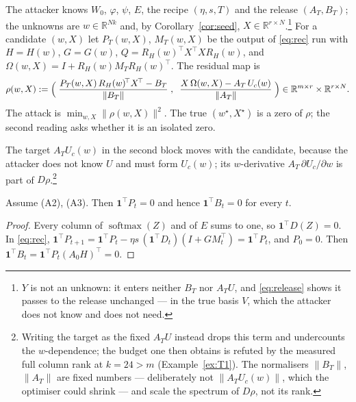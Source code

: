 \begin{definition}\label{def:rho}
The attacker knows $W_0$, $\varphi$, $\psi$, $E$, the recipe $(\eta,s,T)$
and the release $(A_T,B_T)$; the unknowns are $w\in\mathbb R^{Nk}$ and, by
Corollary~\ref{cor:seed}, $X\in\mathbb R^{r\times N}$.\footnote{$Y$ is not an
unknown: it enters neither $B_T$ nor $A_TU$, and \eqref{eq:release} shows it
passes to the release unchanged — in the true basis $V$, which the attacker
does not know and does not need.}
For a candidate $(w,X)$ let $P_T(w,X)$, $M_T(w,X)$ be the output of
\eqref{eq:rec} run with $H=H(w)$, $G=G(w)$, $Q=R_H(w)^{\!\top}X^{\!\top}XR_H(w)$,
and $\Omega(w,X)=I+R_H(w)M_TR_H(w)^{\!\top}$. The residual map is
\begin{equation}\label{eq:rho}
  \rho(w,X):=\Bigl(\;\frac{P_T(w,X)\,R_H(w)^{\!\top}X^{\!\top}-B_T}{\|B_T\|}\;,\;\;
  \frac{X\,\Omega(w,X)-A_T\,U_c(w)}{\|A_T\|}\;\Bigr)
  \in\mathbb R^{m\times r}\times\mathbb R^{r\times N}.
\end{equation}
The attack is $\min_{w,X}\|\rho(w,X)\|^2$. The true $(w^\star,X^\star)$ is a
zero of $\rho$; the second reading asks whether it is an isolated zero.
\end{definition}

The target $A_TU_c(w)$ in the second block moves with the candidate, because
the attacker does not know $U$ and must form $U_c(w)$; its $w$-derivative
$A_T\,\partial U_c/\partial w$ is part of $D\rho$.\footnote{Writing the target
as the fixed $A_TU$ instead drops this term and undercounts the
$w$-dependence; the budget one then obtains is refuted by the measured full
column rank at $k=24>m$ (Example~\ref{ex:T1}). The normalisers $\|B_T\|$,
$\|A_T\|$ are fixed numbers — deliberately not $\|A_TU_c(w)\|$, which the
optimiser could shrink — and scale the spectrum of $D\rho$, not its rank.}

\begin{proposition}\label{prop:simplex}
Assume (A2), (A3). Then $\mathbf 1^{\!\top}P_t=0$ and hence
$\mathbf 1^{\!\top}B_t=0$ for every $t$.
\end{proposition}
\begin{proof}
Every column of $\operatorname{softmax}(Z)$ and of $E$ sums to one, so
$\mathbf 1^{\!\top}D(Z)=0$. In \eqref{eq:rec},
$\mathbf 1^{\!\top}P_{t+1}=\mathbf 1^{\!\top}P_t-\eta s\,(\mathbf 1^{\!\top}D_t)(I+GM_t^{\!\top})=\mathbf 1^{\!\top}P_t$,
and $P_0=0$. Then $\mathbf 1^{\!\top}B_t=\mathbf 1^{\!\top}P_t(A_0H)^{\!\top}=0$.
\end{proof}


